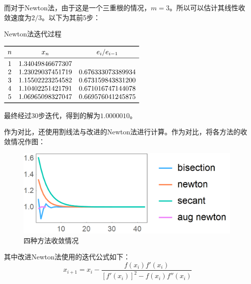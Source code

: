 \documentclass{ctexart}
\begin{document}
而对于Newton法，由于这是一个三重根的情况，$m=3$。所以可以估计其线性收敛速度为$2/3$。以下为其前5步：

\begin{table}[htpb]
\centering
\caption{Newton法迭代过程}
$\begin{array}{ccccc}
    \toprule
n & x_n & e_i/e_{i-1} \\
\midrule
 1 & 1.34049846677307 &  \\
 2 & 1.23029037451719 & 0.676333073389934 \\
 3 & 1.15502223254582 & 0.673159843831200 \\
 4 & 1.10402251421791 & 0.671016747144078 \\
 5 & 1.06965098327047 & 0.669576041245875 \\
\bottomrule
\end{array}\label{table:newton2}$
\end{table}

最终经过30步迭代，得到的解为$1.0000010$。

作为对比，还使用割线法与改进的Newton法进行计算。作为对比，将各方法的收敛情况作图：

\begin{figure}[htbp]
  \centering
  \includegraphics[width=30em]{plot7.png}
  \caption{四种方法收敛情况}
  \label{fig:plot7}
\end{figure}

其中改进Newton法使用的迭代公式如下：
\[
x_{i+1} = x_i - \frac{f(x_i)f'(x_i)}{[f'(x_i)]^2-f(x_i)f''(x_i)}
\]
\end{document}
